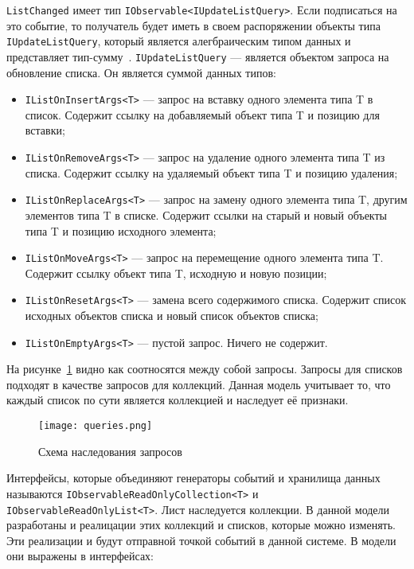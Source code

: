 \lstinline[style=csharpinlinestyle]!ListChanged! имеет тип \lstinline[style=csharpinlinestyle]!IObservable<IUpdateListQuery>!.
Если подписаться на это событие, то получатель будет иметь в своем распоряжении объекты типа \lstinline[style=csharpinlinestyle]!IUpdateListQuery!,
который является алегбраическим типом данных и представляет тип-сумму~\cite{algebraic_data_type}.
\lstinline[style=csharpinlinestyle]!IUpdateListQuery! --- является объектом запроса на обновление списка.
Он является суммой данных типов:

\begin{itemize}
  \item \lstinline[style=csharpinlinestyle]!IListOnInsertArgs<T>! --- запрос на вставку одного элемента типа T в список. Содержит ссылку на добавляемый объект типа T и позицию для вставки;
  \item \lstinline[style=csharpinlinestyle]!IListOnRemoveArgs<T>! --- запрос на удаление одного элемента типа T из списка. Содержит ссылку на удаляемый объект типа T и позицию удаления;
  \item \lstinline[style=csharpinlinestyle]!IListOnReplaceArgs<T>! --- запрос на замену одного элемента типа T, другим элементов типа T в списке.
  Содержит ссылки на старый и новый объекты типа T и позицию исходного элемента;
  \item \lstinline[style=csharpinlinestyle]!IListOnMoveArgs<T>! --- запрос на перемещение одного элемента типа T. Содержит ссылку объект типа T, исходную и новую позиции;
  \item \lstinline[style=csharpinlinestyle]!IListOnResetArgs<T>! --- замена всего содержимого списка. Содержит список исходных объектов списка и новый список объектов списка;
  \item \lstinline[style=csharpinlinestyle]!IListOnEmptyArgs<T>! --- пустой запрос. Ничего не содержит.
\end{itemize}

На рисунке~\ref{fig:queries} видно как соотносятся между собой запросы. Запросы для списков подходят в качестве запросов для коллекций.
Данная модель учитывает то, что каждый список по сути является коллекцией и наследует её признаки.

\begin{figure}[ht]
\centering
  \texttt{[image: queries.png]}
  \caption{ Схема наследования запросов }
  \label{fig:queries}
\end{figure}

Интерфейсы, которые объединяют генераторы событий и хранилища данных называются \lstinline[style=csharpinlinestyle]!IObservableReadOnlyCollection<T>! и \lstinline[style=csharpinlinestyle]!IObservableReadOnlyList<T>!.
Лист наследуется коллекции. В данной модели разработаны и реалицации этих коллекций и списков, которые можно изменять. Эти реализации и будут отправной точкой событий в данной системе.
В модели они выражены в интерфейсах:

